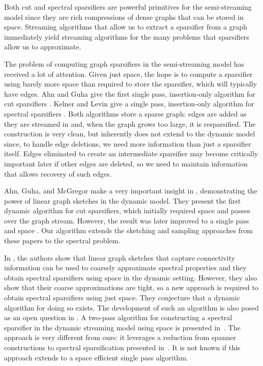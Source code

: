 \documentclass[11pt]{article}
\begin{document}
\if Both cut and spectral sparsifiers are powerful primitives for the semi-streaming model since they are rich compressions of dense graphs that can be stored in  space. Streaming algorithms that allow us to extract a sparsifier from a graph immediately yield streaming algorithms for the many problems that sparsifiers allow us to approximate. 
\fi

The problem of computing graph sparsifiers in the semi-streaming model has received a lot of attention. Given just  space, the hope is to compute a sparsifier using barely more space than required to store the sparsifier, which will typically have  edges.  Ahn and Guha give the first single pass, insertion-only algorithm for cut sparsifiers \cite{ahnStreamingSparsification}. Kelner and Levin give a single pass, insertion-only algorithm for spectral sparsifiers \cite{kelner2011spectral}. Both algorithms store a sparse graph: edges are added as they are streamed in and, when the graph grows too large, it is resparsified. The construction is very clean, but inherently does not extend to the dynamic model since, to handle edge deletions, we need more information than just a sparsifier itself. Edges eliminated to create an intermediate sparsifier may become critically important later if other edges are deleted, so we need to maintain information that allows recovery of such edges.

Ahn, Guha, and McGregor make a very important insight in \cite{linearMeasurement}, demonstrating the power of linear graph sketches in the dynamic model. They present the first dynamic algorithm for cut sparsifiers, which initially required  space and  passes over the graph stream. However, the result was later improved to a single pass and  space \cite{gssss,goel2012single}. Our algorithm extends the sketching and sampling approaches from these papers to the spectral problem.

In \cite{ahn2013spectral}, the authors show that linear graph sketches that capture connectivity information can be used to coarsely approximate spectral properties and they obtain spectral sparsifiers using  space in the dynamic setting. However, they also show that their coarse approximations are tight, so a new approach is required to obtain spectral sparsifiers using just  space. They conjecture that a dynamic algorithm for doing so exists. The development of such an algorithm is also posed as an open question in \cite{gregorSurvey}. A two-pass algorithm for constructing a spectral sparsifier in the dynamic streaming model using  space is presented in~\cite{KW14}. The approach is very different from ours: it leverages a reduction from spanner constructions to spectral sparsification presented in~\cite{KP12}. It is not known if this approach extends to a space efficient single pass algorithm.
\end{document}
